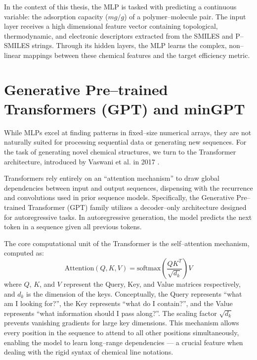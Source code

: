 In the context of this thesis, the MLP is tasked with predicting a continuous variable: the adsorption capacity ($mg/g$) of a polymer--molecule pair. The input layer receives a high dimensional feature vector containing topological, thermodynamic, and electronic descriptors extracted from the SMILES and P--SMILES strings. Through its hidden layers, the MLP learns the complex, non--linear mappings between these chemical features and the target efficiency metric.

\section{Generative Pre--trained Transformers (GPT) and minGPT}
\label{sec:mingpt}

While MLPs excel at finding patterns in fixed--size numerical arrays, they are not naturally suited for processing sequential data or generating new sequences. For the task of generating novel chemical structures, we turn to the Transformer architecture, introduced by Vaswani et al. in 2017 \cite{vaswani2017attention}.

Transformers rely entirely on an ``attention mechanism'' to draw global dependencies between input and output sequences, dispensing with the recurrence and convolutions used in prior sequence models. Specifically, the Generative Pre--trained Transformer (GPT) family \cite{radford2018improving} utilizes a decoder--only architecture designed for autoregressive tasks.  In autoregressive generation, the model predicts the next token in a sequence given all previous tokens.

The core computational unit of the Transformer is the self--attention mechanism, computed as:
\begin{equation}
	\text{Attention}(Q, K, V) = \text{softmax}\left(\frac{QK^T}{\sqrt{d_k}}\right)V
\end{equation}
where $Q$, $K$, and $V$ represent the Query, Key, and Value matrices respectively, and $d_k$ is the dimension of the keys. Conceptually, the Query represents ``what am I looking for?'', the Key represents ``what do I contain?'', and the Value represents ``what information should I pass along?''. The scaling factor $\sqrt{d_k}$ prevents vanishing gradients for large key dimensions. This mechanism allows every position in the sequence to attend to all other positions simultaneously, enabling the model to learn long--range dependencies — a crucial feature when dealing with the rigid syntax of chemical line notations.

